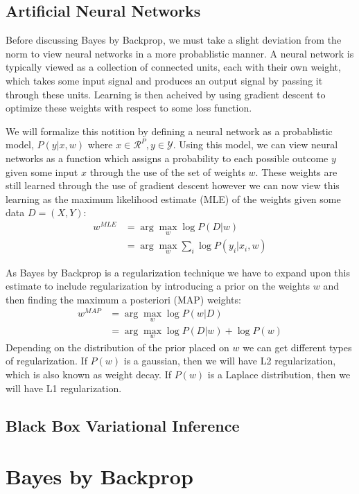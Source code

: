 \documentclass[11pt]{article}
\begin{document}
\subsection{Artificial Neural Networks}
Before discussing Bayes by Backprop, we must take a slight deviation from
the norm to view neural networks in a more probablistic manner. A neural 
network is typically viewed as a collection of connected units, each with 
their own weight, which takes some input signal and produces an output
signal by passing it through these units. Learning is then acheived by 
using gradient descent to optimize these weights with respect to some loss
function. 

We will formalize this notition by defining a neural network as a probablistic
model, $P(y|x,w)$ where $x \in \mathcal{R}^P, y \in \mathcal{Y}$. Using this 
model, we can view neural networks as a function which assigns a probability
to each possible outcome $y$ given some input $x$ through the use of the set
of weights $w$. These weights are still learned through the use of gradient 
descent however we can now view this learning as the maximum likelihood 
estimate (MLE) of the weights given some data $D=(X,Y)$:
\begin{align*}
  w^{MLE} &= \arg\max_w \log P(D|w) \\ 
  &= \arg\max_w \sum_i \log P(y_i|x_i, w) 
\end{align*}

As Bayes by Backprop is a regularization technique we have to expand upon this
estimate to include regularization by introducing a prior on the weights $w$ 
and then finding the maximum a posteriori (MAP) weights:
\begin{align*}
  w^{MAP} &= \arg\max_w \log P(w|D) \\
  &= \arg\max_w \log P(D|w) + \log P(w) 
\end{align*}
Depending on the distribution of the prior placed on $w$ we can get different
types of regularization. If $P(w)$ is a gaussian, then we will have L2 
regularization, which is also known as weight decay. If $P(w)$ is a
Laplace distribution, then we will have L1 regularization.


\subsection{Black Box Variational Inference}

\section{Bayes by Backprop} \label{bayes_by_backprop}
\end{document}
